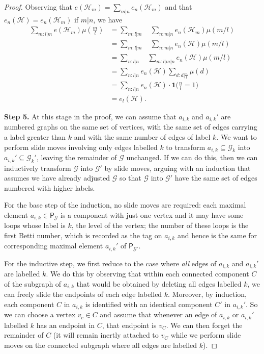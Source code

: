 \documentclass[11pt, a4 paper]{amsart}
\numberwithin{equation}{section}
\theoremstyle{remark}
\theoremstyle{definition}
\def\st{\colon} %
\begin{document}
\begin{proof}
	Observing that $e(\mathcal{H}_m) = \sum_{m|n} e_n(\mathcal{H}_m)$ and that
	$e_n(\mathcal{H}) = e_n(\mathcal{H}_m)$ if $m|n$,  we have  
	\begin{align*}
		\sum_{m \st l|m} e(\mathcal{H}_m) \mu(\frac{m}{l}) &
		= \sum_{m \st l|m} \quad \sum_{n \st m|n} e_n(\mathcal{H}_m) \mu(m/l)\\&
		= \sum_{m \st l|m} \quad \sum_{n \st m|n} e_n(\mathcal{H}) \mu(m/l)\\&
		= \sum_{n \st l|n} \quad \sum_{m \st l|m|n} e_n(\mathcal{H}) \mu(m/l)\\&
		= \sum_{n \st l|n} e_n(\mathcal{H}) \sum_{d \st d|\frac{n}{l}} \mu(d)\\&
		= \sum_{n \st l|n} e_n(\mathcal{H}) \cdot \mathbf{1}\big(\frac{n}{l} = 1\big)\\&
		= e_l(\mathcal{H}).
	\end{align*}
	
	\textbf{Step 5.} At this stage in the proof, we can assume that $a_{i, k}$ and $a_{i, k}'$ 
	are numbered graphs on the same set of vertices, %
	with  the same set of edges carrying  a label greater than $k$
	and with the same number of edges of label $k$. We want to perform  slide moves
	involving only edges labelled $k$ to transform $a_{i,k}\subseteq \mathcal{G}_k$ into $a_{i,k}'\subseteq \mathcal{G}_k'$,
	leaving the remainder of $\mathcal{G}$ unchanged.
	If we can do this, then we can inductively transform $\mathcal{G}$ into $\mathcal{G}'$
	by slide moves, arguing with an induction that assumes we have already adjusted $\mathcal{G}$
	so that $\mathcal{G}$ into $\mathcal{G}'$ have the same set of edges numbered with higher labels.
	
	For the base step of the induction, no slide moves are required: each
	maximal element $a_{i,k}\in \mathsf{P}_\mathcal{G}$ is a component with just one vertex and it  may 
	have some loops whose label is $k$, the level of the vertex; 
	the number of these loops is the first Betti number, which is recorded as the tag on $a_{i,k}$
	and hence is the same for corresponding maximal element $a_{i,k}'$ of $ \mathsf{P}_{\mathcal{G}'}$.  
	
	For the inductive step, we first reduce to the case where
	\emph{all} edges of $a_{i, k}$ and $a_{i, k}'$ are labelled $k$. We do this by observing that
	within each connected component $C$ of the subgraph of $a_{i,k}$
	that would be obtained  by deleting all edges labelled $k$,
	we can freely slide the endpoints of each edge labelled $k$.
	Moreover, by induction, each component $C$ in $a_{i,k}$  is identified with an identical component $C'$ in $a_{i,k}'$.
	So we can choose a vertex $v_c\in C$ and assume that whenever an edge of $a_{i,k}$ or $a_{i,k}'$
	labelled $k$ has an endpoint in $C$, that endpoint is $v_C$. We can then forget the remainder of $C$ (it will
	remain inertly attached to $v_C$ while we perform slide moves on the connected subgraph where all edges are labelled $k$).
	

\end{proof}
\end{document}
